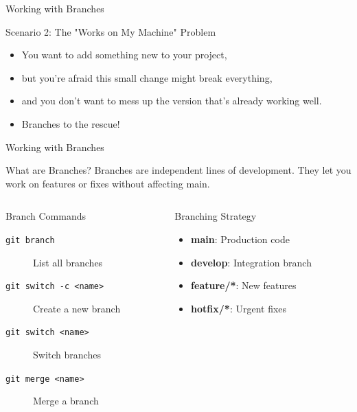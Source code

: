 \documentclass[aspectratio=169]{beamer}
\begin{document}


\begin{frame}{Working with Branches}
\begin{block}{Scenario 2: The "Works on My Machine" Problem}
\begin{itemize}
  \item You want to add something new to your project,
  \item but you're afraid this small change might break everything,
  \item and you don't want to mess up the version that's already working well.
  \item \alert{Branches to the rescue!}
\end{itemize}
\end{block}



\end{frame}
\begin{frame}{Working with Branches}
  \begin{block}{What are Branches?}
    Branches are independent lines of development. They let you work on features or fixes without affecting main.
  \end{block}

  \begin{columns}
    \begin{column}{0.48\textwidth}
      \begin{block}{Branch Commands}
        \begin{description}
          \item[\texttt{git branch}] List all branches
          \item[\texttt{git switch  -c <name>}] Create a new branch
          \item[\texttt{git switch <name>}] Switch branches
          \item[\texttt{git merge <name>}] Merge a branch
        \end{description}
      \end{block}
    \end{column}
    \begin{column}{0.48\textwidth}
      \begin{exampleblock}{Branching Strategy}
        \begin{itemize}
          \item \textbf{main}: Production code
          \item \textbf{develop}: Integration branch
          \item \textbf{feature/*}: New features
          \item \textbf{hotfix/*}: Urgent fixes
        \end{itemize}
      \end{exampleblock}
    \end{column}
  \end{columns}
\end{frame}
\end{document}
